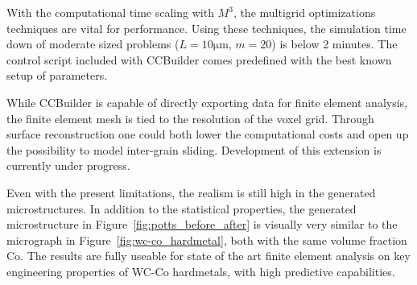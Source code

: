 \documentclass[3p,12pt]{elsarticle}
\begin{document}
With the computational time scaling with $M^3$, the multigrid optimizations techniques are vital for performance.
Using these techniques, the simulation time down of moderate sized problems ($L = 10\si{\micro\meter}$, $m = 20$) is below 2 minutes.
The control script included with CCBuilder comes predefined with the best known setup of parameters.

While CCBuilder is capable of directly exporting data for finite element analysis, the finite element mesh is tied to the resolution of the voxel grid.
Through surface reconstruction one could both lower the computational costs and open up the possibility to model inter-grain sliding.
Development of this extension is currently under progress.

Even with the present limitations, the realism is still high in the generated microstructures.
In addition to the statistical properties, the generated microstructure in Figure~\ref{fig:potts_before_after} is visually very similar to the micrograph in Figure~\ref{fig:wc-co_hardmetal}, both with the same volume fraction Co.
The results are fully useable for state of the art finite element analysis on key engineering properties of WC-Co hardmetals, with high predictive capabilities.




\end{document}
